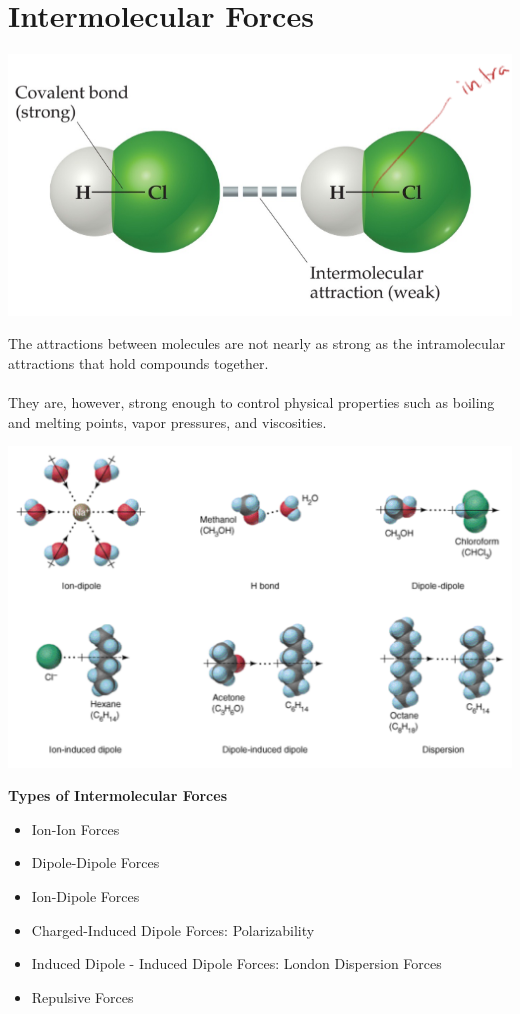 \documentclass[10pt]{article}
\begin{document}
\section*{Intermolecular Forces}
\begin{center}
    \includegraphics[scale=0.5]{W2_2.png}
\end{center}
The attractions between molecules are not nearly as strong as the intramolecular attractions that hold compounds together.\\\\
They are, however, strong enough to control physical properties such as boiling and melting points, vapor pressures, and viscosities.
\begin{center}
    \includegraphics[scale=0.3]{W2_3.png}
\end{center}
\textbf{Types of Intermolecular Forces}
\begin{itemize}
    \item Ion-Ion Forces
    \item Dipole-Dipole Forces
    \item Ion-Dipole Forces
    \item Charged-Induced Dipole Forces: Polarizability
    \item Induced Dipole - Induced Dipole Forces: London Dispersion Forces
    \item Repulsive Forces
\end{itemize}
\end{document}
